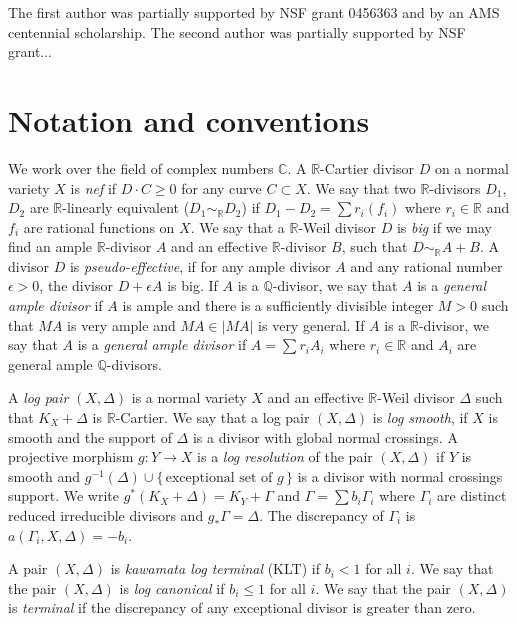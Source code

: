 \documentclass[12pt]{amsart}
\theoremstyle{plain}
\newcommand\R{{\mathbb{R}}}
\begin{document}
\medskip
{}
   The first author was partially supported by NSF grant
  0456363 and by an AMS centennial scholarship.  
 The second author was partially supported by NSF grant...
\section{Notation and conventions}
\label{s-notation}
We work over the field of complex numbers $\mathbb{C}$.  A $\mathbb{R}$-Cartier divisor
$D$ on a normal variety $X$ is \textit{nef} if $D\cdot C\geq 0$ for any curve $C\subset X$. 
We say that two $\mathbb{R}$-divisors $D_1$, $D_2$ are $\mathbb{R}$-linearly
equivalent ($D_1\sim _{\mathbb{R}} D_2$) if $D_1-D_2=\sum r_i(f_i)$
where $r_i\in \R$ and $f_i$ are rational functions on $X$.
We say that a $\mathbb{R}$-Weil divisor $D$ is {\it big} 
if we may
find an ample $\mathbb{R}$-divisor $A$ and an effective $\mathbb{R}$-divisor $B$, such
that $D \sim _{\mathbb{R}} A+B$.
A divisor $D$ is {\it pseudo-effective}, 
if for any ample divisor $A$ and any rational number $\epsilon >0$, the
divisor $D+\epsilon A$ is big.
If $A$ is a $\mathbb Q$-divisor, we say that $A$ is a {\it general ample
divisor} if $A$ is ample and there is a sufficiently divisible integer $M>0$
such that $MA$ is very ample and $MA\in |MA|$ is very general.
If $A$ is a $\mathbb R$-divisor, we say that $A$ is a {\it general ample
divisor} if $A=\sum r_iA_i$ where $r_i\in \R$ and $A_i$ are general ample
$\mathbb Q$-divisors.

A \textit{log pair} $(X,\Delta)$ is a normal variety $X$ and an effective
$\mathbb{R}$-Weil divisor $\Delta$ such that $K_X+\Delta$ is 
$\mathbb{R}$-Cartier. 
 We say
that a log pair $(X,\Delta)$ is \textit{log smooth}, if $X$ is smooth and the support of
$\Delta$ is a divisor with global normal crossings.  A projective morphism $g \colon
Y\to X$ is a \textit{log resolution} of the pair $(X,\Delta )$ if $Y$ is smooth and
$g^{-1}(\Delta )\cup \{\,\text {exceptional set of $g$}\,\}$ is a divisor with normal
crossings support.  We write $g^*(K_X +\Delta )=K_Y +\Gamma$ and $\Gamma =\sum b_i\Gamma
_i$ where $\Gamma _i$ are distinct reduced irreducible divisors and $g_*\Gamma =\Delta$.  The discrepancy of
$\Gamma_i$ is $a(\Gamma _i,X,\Delta)=-b_i$.  

A pair $(X,\Delta)$ is {\it kawamata
log terminal} (KLT) if $b_i<1$ for all $i$.
We say that the pair
$(X,\Delta)$ is \textit{log canonical} if $b_i\leq 1$ for all $i$.
We say that the pair
$(X,\Delta)$ is \textit{terminal} if the discrepancy of any exceptional
divisor is greater than zero.
\end{document}
